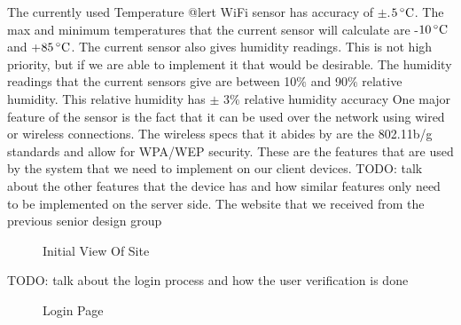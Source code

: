 \documentclass{report}
\begin{document}
	\newline
	\indent
	The currently used Temperature @lert WiFi sensor has accuracy of $\pm$.$5\,^{\circ}{\rm C}$. The max and minimum temperatures that the current sensor will calculate are -$10\,^{\circ}{\rm C}$ and +$85\,^{\circ}{\rm C}$. The current sensor also gives humidity readings. This is not high priority, but if we are able to implement it that would be desirable.
 The humidity readings that the current sensors give are between 10$\%$ and 90$\%$ relative humidity. 
This relative humidity has $\pm$ 3$\%$ relative humidity accuracy One major feature of the sensor is the fact that it can be used over the network using wired or wireless connections. 
The wireless specs that it abides by are the 802.11b/g standards and allow for WPA/WEP security. These are the features that are used by the system that we need to implement on our client devices.
	\newline
	\indent
	TODO: talk about the other features that the device has and how similar features only need to be implemented on the server side.
	\newline
	\indent
	The website that we received from the previous senior design group 
\begin{figure}[H]
\caption{Initial View Of Site}
\end{figure}
\newpage
	TODO: talk about the login process and how the user verification is done
\begin{figure}[H]
\caption{Login Page}
\end{figure}
\end{document}
